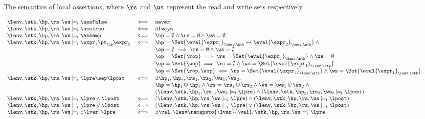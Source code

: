 The semantics of local assertions, where \( \rs \) and \( \ws \) represent the read and write sets respectively.

\[
    \begin{array}{l c l}
        \lenv, \stk, \hp, \rs, \ws \models_{l} \assfalse & \iff & \texttt{never} \\
        \lenv, \stk, \hp, \rs, \ws \models_{l} \asstrue & \iff & \texttt{always} \\
        \lenv, \stk, \hp, \rs, \ws \models_{l} \assemp & \iff & \hp = \emptyset \land \rs = \emptyset \land \ws = \emptyset \\
        \lenv, \stk, \hp, \rs, \ws \models_{l} \expr_{1} \pt_{\op} \expr_{2} & \iff & \hp = \Set{\eval{\expr_{1}}_{\lenv, \stk} \mapsto \eval{\expr_{2}}_{\lenv, \stk}} \land {} \\
                                                                             & & \op = \emptyset \implies \rs = \emptyset \land \ws = \emptyset \\
                                                                             & & \op = \Set{\rop} \implies \rs = \Set{\eval{\expr_{1}}_{\lenv, \stk}} \land \ws = \emptyset \\
                                                                             & & \op = \Set{\wop} \implies \rs = \emptyset \land \ws = \Set{\eval{\expr_{1}}_{\lenv, \stk}}  \\
                                                                             & & \op = \Set{\rop,\wop} \implies \rs = \Set{\eval{\expr_{1}}_{\lenv, \stk}} \land \ws = \Set{\eval{\expr_{1}}_{\lenv, \stk}}  \\
        \lenv, \stk, \hp, \rs, \ws \models_{l} \lpre \sep \lpost & \iff &  \exists \hp_{1}, \hp_{2}, \rs_{1}, \rs_{2}, \ws_{1}, \ws_{2} \ldotp \\
                                                                 & & \hp = \hp_{1} \uplus \hp_{2} \land \rs = \rs_{1} \uplus \rs_{2} \land \ws = \ws_{1} \uplus \ws_{2} \land {} \\
                                                                 & &  ( \lenv, \stk, \hp_{1}, \rs_{1}, \ws_{1} \models_{l} \lpre ) \land ( \lenv, \stk, \hp_{2}, \rs_{2}, \ws_{2} \models_{l} \lpost ) \\
        \lenv, \stk, \hp, \rs, \ws \models_{l} \lpre \land \lpost & \iff & ( \lenv, \stk, \hp, \rs, \ws \models_{l} \lpre ) \land ( \lenv, \stk, \hp, \rs, \ws \models_{l} \lpost ) \\
        \lenv, \stk, \hp, \rs, \ws \models_{l} \lpre \lor \lpost & \iff & ( \lenv, \stk, \hp, \rs, \ws \models_{l} \lpre ) \lor ( \lenv, \stk, \hp, \rs, \ws \models_{l} \lpost ) \\
        \lenv, \stk, \hp, \rs, \ws \models_{l} \exists \lvar \ldotp \lpre & \iff & \exists \val \ldotp \lenv\remapsto{\lvar}{\val}, \stk, \hp, \rs, \ws \models_{l} \lpre \\
    \end{array}
\]

